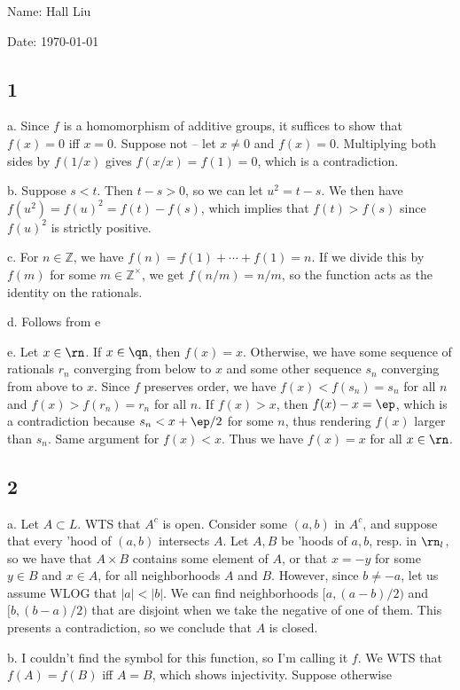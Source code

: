 \documentclass{article}
\begin{document}
Name: Hall Liu

Date: \today 
\vspace{1.5cm}
\subsection*{1}
a. Since $f$ is a homomorphism of additive groups, it suffices to show that $f(x)=0$ iff $x=0$. Suppose not -- let $x\neq0$ and $f(x)=0$. Multiplying both sides by $f(1/x)$ gives $f(x/x)=f(1)=0$, which is a contradiction.

b. Suppose $s<t$. Then $t-s>0$, so we can let $u^2=t-s$. We then have $f(u^2)=f(u)^2=f(t)-f(s)$, which implies that $f(t)>f(s)$ since $f(u)^2$ is strictly positive.

c. For $n\in\mathbb{Z}$, we have $f(n)=f(1)+\cdots+f(1)=n$. If we divide this by $f(m)$ for some $m\in\mathbb{Z}^\times$, we get $f(n/m)=n/m$, so the function acts as the identity on the rationals.

d. Follows from e

e. Let $x\in\rn$. If $x\in\qn$, then $f(x)=x$. Otherwise, we have some sequence of rationals $r_n$ converging from below to $x$ and some other sequence $s_n$ converging from above to $x$. Since $f$ preserves order, we have $f(x)<f(s_n)=s_n$ for all $n$ and $f(x)>f(r_n)=r_n$ for all $n$. If $f(x)>x$, then $f(x)-x=\ep$, which is a contradiction because $s_n<x+\ep/2$ for some $n$, thus rendering $f(x)$ larger than $s_n$. Same argument for $f(x)<x$. Thus we have $f(x)=x$ for all $x\in\rn$.
\subsection*{2}
a. Let $A\subset L$. WTS that $A^c$ is open. Consider some $(a,b)$ in $A^c$, and suppose that every 'hood of $(a,b)$ intersects $A$. Let $A,B$ be 'hoods of $a,b$, resp. in $\rn_l$, so we have that $A\times B$ contains some element of $A$, or that $x=-y$ for some $y\in B$ and $x\in A$, for all neighborhoods $A$ and $B$. However, since $b\neq -a$, let us assume WLOG that $|a|<|b|$. We can find neighborhoods $[a,(a-b)/2)$ and $[b,(b-a)/2)$ that are disjoint when we take the negative of one of them. This presents a contradiction, so we conclude that $A$ is closed.

b. I couldn't find the symbol for this function, so I'm calling it $f$. We WTS that $f(A)=f(B)$ iff $A=B$, which shows injectivity. Suppose otherwise 
\end{document}
